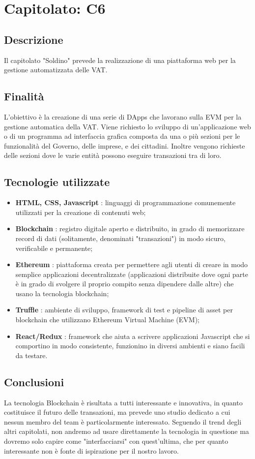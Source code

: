 \section{Capitolato: C6}
	\subsection{Descrizione}
		Il capitolato "Soldino" prevede la realizzazione di una piattaforma web per la gestione automatizzata delle VAT.
	\subsection{Finalità}
		L'obiettivo è la creazione di una serie di DApps che lavorano sulla EVM per la gestione automatica della VAT.
		Viene richiesto lo sviluppo di un'applicazione web o di un programma ad interfaccia grafica composta da una o più sezioni per le funzionalità del Governo, delle imprese, e dei cittadini. Inoltre vengono richieste delle sezioni dove le varie entità possono eseguire transazioni tra di loro.
	\subsection{Tecnologie utilizzate}
		\begin{itemize}
			\item \textbf{HTML, CSS, Javascript} : linguaggi di programmazione comunemente utilizzati per la creazione di contenuti web;
			\item \textbf{Blockchain} : registro digitale aperto e distribuito, in grado di memorizzare record di dati (solitamente, denominati "transazioni") in modo sicuro, verificabile e permanente;
			\item \textbf{Ethereum} : piattaforma creata per permettere agli utenti di creare in modo semplice applicazioni decentralizzate (applicazioni distribuite dove ogni parte è in grado di svolgere il proprio compito senza dipendere dalle altre) che usano la tecnologia blockchain;
			\item \textbf{Truffle} : ambiente di sviluppo, framework di test e pipeline di asset per blockchain che utilizzano Ethereum Virtual Machine (EVM);
			\item \textbf{React/Redux} : framework che aiuta a scrivere applicazioni Javascript che si comportino in modo consistente, funzionino in diversi ambienti e siano facili da testare.
		\end{itemize}
	\subsection{Conclusioni}
		La tecnologia Blockchain è risultata a tutti interessante e innovativa, in quanto costituisce il futuro delle transazioni, ma prevede uno studio dedicato a cui nessun membro del team è particolarmente interessato. Seguendo il trend degli altri capitolati, non andremo ad usare direttamente la tecnologia in questione ma dovremo solo capire come "interfacciarsi" con quest'ultima, che per quanto interessante non è fonte di ispirazione per il nostro lavoro.